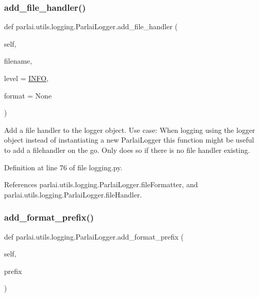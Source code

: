 \subsubsection{\texorpdfstring{add\+\_\+file\+\_\+handler()}{add\_file\_handler()}}
{\footnotesize\ttfamily def parlai.\+utils.\+logging.\+Parlai\+Logger.\+add\+\_\+file\+\_\+handler (\begin{DoxyParamCaption}\item[{}]{self,  }\item[{}]{filename,  }\item[{}]{level = {\ttfamily \hyperlink{namespaceparlai_1_1utils_1_1logging_a4bc2de74317465e5d1a8b5d7b913d48a}{I\+N\+FO}},  }\item[{}]{format = {\ttfamily None} }\end{DoxyParamCaption})}

\begin{DoxyVerb}Add a file handler to the logger object.
Use case: When logging using the logger object instead of instantiating a new ParlaiLogger
  this function might  be useful to add a filehandler on the go.
Only does so if there is no file handler existing.
\end{DoxyVerb}
 

Definition at line 76 of file logging.\+py.



References parlai.\+utils.\+logging.\+Parlai\+Logger.\+file\+Formatter, and parlai.\+utils.\+logging.\+Parlai\+Logger.\+file\+Handler.

\mbox{\label{classparlai_1_1utils_1_1logging_1_1ParlaiLogger_a160769d211d1700c2922c1ff65c83734}} 
\subsubsection{\texorpdfstring{add\+\_\+format\+\_\+prefix()}{add\_format\_prefix()}}
{\footnotesize\ttfamily def parlai.\+utils.\+logging.\+Parlai\+Logger.\+add\+\_\+format\+\_\+prefix (\begin{DoxyParamCaption}\item[{}]{self,  }\item[{}]{prefix }\end{DoxyParamCaption})}

